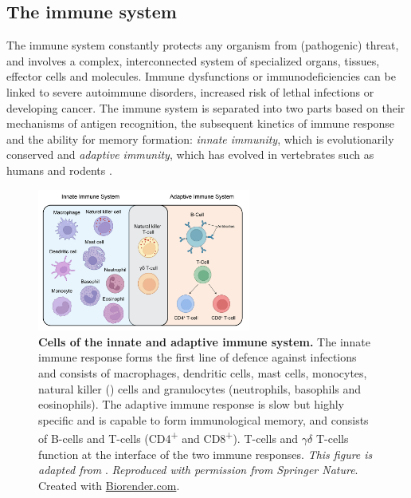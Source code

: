 
\subsection{The immune system}

\par The immune system constantly protects any organism from (pathogenic) threat, and involves a complex, interconnected system of specialized organs, tissues, effector cells and molecules. Immune dysfunctions or immunodeficiencies can be linked to severe autoimmune disorders, increased risk of lethal infections or developing cancer. The immune system is separated into two parts based on their mechanisms of antigen recognition, the subsequent kinetics of immune response and the ability for memory formation: \textit{innate immunity}, which is evolutionarily conserved and \textit{adaptive immunity}, which has evolved in vertebrates such as humans and rodents \textbf{\cite{orange_natural_2013,murphy_janeways_2017}}.\\


\begin{figure}
    \centering
    \includegraphics[width=7cm]{Chapter1/Fig/F1-15-01.png}
    \caption[Cells of the immune system]{\textbf{Cells of the innate and adaptive immune system.} The innate immune response forms the first line of defence against infections and consists of macrophages, dendritic cells, mast cells, monocytes, natural killer () cells and granulocytes (neutrophils, basophils and eosinophils). The adaptive immune response is slow but highly specific and is capable to form immunological memory, and consists of B-cells and T-cells (CD4\textsuperscript{+} and CD8\textsuperscript{+}).  T-cells and $\gamma\delta$ T-cells function at the interface of the two immune responses. \textit{This figure is adapted from} \textbf{\cite{dranoff_cytokines_2004}}.\textit{ Reproduced with permission from Springer Nature}. Created with \href{https://www.biorender.com/}{Biorender.com}.}
    \vspace{50pt}
    \label{fig:chp1_immunesystem}
\end{figure}

